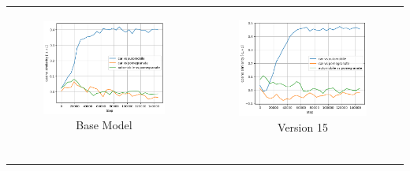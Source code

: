 \begin{table}[ht]
  \centering
  \begin{tabular}{cc}
    \begin{subfigure}{0.45\textwidth}
      \includegraphics[width=\linewidth]{img/pom_base.png}
      \caption{Base Model}
    \end{subfigure} &
    \begin{subfigure}{0.45\textwidth}
      \includegraphics[width=\linewidth]{img/pom_v15.png}
      \caption{Version 15}
    \end{subfigure} \\
    \begin{subfigure}{0.45\textwidth}

\end{subfigure}
\end{tabular}
\end{table}
